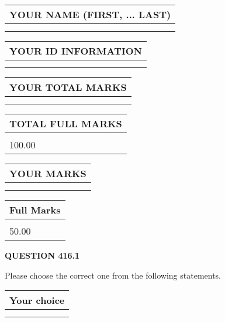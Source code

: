 \documentclass[12pt]{article}
\begin{document}
 
 
   
   
\newpage 
\setcounter{page}{ 
   416001 } 
   
   
   
   
\noindent\begin{tabular}{|l|}
\hline
YOUR NAME (FIRST, ... LAST)  \\
\hline
 \\ 
 \\ 
\hline
\end{tabular}
\hspace{0.05in} \begin{tabular}{|l|}
\hline
 YOUR   ID   INFORMATION  \\
\hline
 \\ 
 \\ 
\hline
\end{tabular}
   
   
\vspace{0.2in}\noindent\begin{tabular}{|l|}
\hline
YOUR TOTAL MARKS  \\
\hline
 \\ 
 \\ 
\hline
\end{tabular}
\hspace{0.05in} \begin{tabular}{|l|}
\hline
TOTAL FULL MARKS  \\
\hline
 \\ 
100.00 \\
\hline
\end{tabular}
  
\vspace{0.2in}
  
\noindent\begin{tabular}{|l|}
\hline
 YOUR MARKS  \\
\hline
 \\ 
 \\ 
\hline
\end{tabular}
\hspace{0.05in} \begin{tabular}{|l|}
\hline
 Full Marks  \\
\hline
 \\ 
50.00 \\
\hline
\end{tabular}
{\textbf{\Large{QUESTION
416.1 
}}}
  
  
Please choose the correct one from the following statements.
  
  
\noindent\hspace{3.0in} \begin{tabular}{|l|}
\hline
Your choice \\
\hline
 \\ 
 \\ 
\hline
\end{tabular}
  
\end{document}
